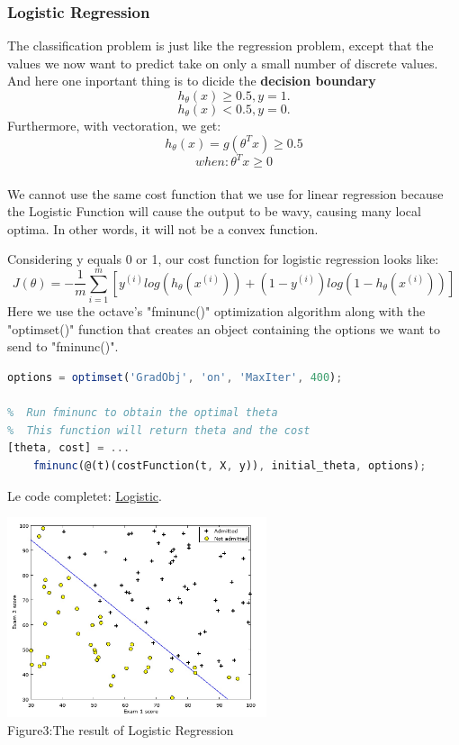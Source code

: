 \documentclass[a4paper]{article}
\begin{document}
{\subsubsection{\textbf{Logistic Regression}}
The classification problem is just like the regression problem, except that the values we now want to predict take on only a small number of discrete values. And here one inportant thing is to dicide the \textbf{decision boundary}$$h_\theta(x)\ge0.5,y=1.$$
	$$h_\theta(x)<0.5,y=0.$$
Furthermore, with vectoration, we get:$$h_\theta(x)=g(\theta^Tx)\ge0.5$$$$when:\theta^Tx\ge0$$\\We cannot use the same cost function that we use for linear regression because the Logistic Function will cause the output to be wavy, causing many local optima. In other words, it will not be a convex function.

Considering y equals 0 or 1, our cost function for logistic regression looks like:$$J(\theta)=-\frac{1}{m}\sum_{i=1}^m[y^{(i)}log(h_\theta(x^{(i)}))+(1-y^{(i)})log(1-h_\theta(x^{(i)}))]$$
Here we use the octave's "fminunc()" optimization algorithm along with the "optimset()" function that creates an object containing the options we want to send to "fminunc()".
\begin{lstlisting}[language=Octave]
%  Set options for fminunc:
options = optimset('GradObj', 'on', 'MaxIter', 400);

%  Run fminunc to obtain the optimal theta
%  This function will return theta and the cost 
[theta, cost] = ...
	fminunc(@(t)(costFunction(t, X, y)), initial_theta, options);

\end{lstlisting}
Le code completet: \href{https://github.com/GuangYueCHEN/ENSIIE/tree/master/Plus/MachineLearning/machine-learning-ex2}{Logistic}.
\newpage
\begin{center}
\includegraphics[width=3in]{log.png}\\
Figure3:The result of Logistic Regression
\end{center}
}
\end{document}
